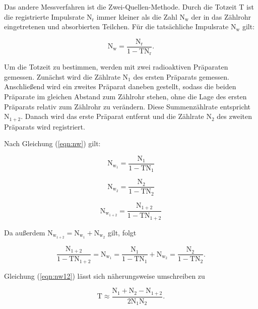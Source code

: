 \noindent
Das andere Messverfahren ist die Zwei-Quellen-Methode.
Durch die Totzeit T ist die registrierte Impulsrate $\text{N}_\text{r}$ immer kleiner als die Zahl $\text{N}_\text{w}$ der in das Zählrohr eingetretenen und absorbierten Teilchen.
Für die tatsächliche Impulsrate $\text{N}_\text{w}$ gilt:

\begin{equation}
\text{N}_\text{w}=\frac{\text{N}_\text{r}}{1-\text{T}\text{N}_\text{r}}.
\label{eqn:nw}
\end{equation}

\noindent
Um die Totzeit zu bestimmen, werden mit zwei radioaktiven Präparaten gemessen.
Zunächst wird die Zählrate $\text{N}_1$ des ersten Präparats gemessen.
Anschließend wird ein zweites Präparat daneben gestellt, sodass die beiden Präparate im gleichen Abstand zum Zählrohr stehen, 
ohne die Lage des ersten Präparats relativ zum Zählrohr zu verändern.
Diese Summenzählrate entspricht $\text{N}_{1+2}$.
Danach wird das erste Präparat entfernt und die Zählrate $\text{N}_2$ des zweiten Präparats wird registriert.

\noindent
Nach Gleichung (\ref{eqn:nw}) gilt:

\begin{equation*}
\text{N}_{\text{w}_1}=\frac{\text{N}_1}{1-\text{T}\text{N}_1}
\end{equation*}

\begin{equation*}
\text{N}_{\text{w}_2}=\frac{\text{N}_2}{1-\text{T}\text{N}_2}
\end{equation*}

\begin{equation*}
\text{N}_{\text{w}_{1+2}}=\frac{\text{N}_{1+2}}{1-\text{T}\text{N}_{1+2}}
\end{equation*}

\noindent
Da außerdem $\text{N}_{\text{w}_{1+2}}=\text{N}_{\text{w}_1}+\text{N}_{\text{w}_2}$ gilt, folgt

\begin{equation}
\frac{\text{N}_{1+2}}{1-\text{T}\text{N}_{1+2}}=\text{N}_{\text{w}_1}=\frac{\text{N}_1}{1-\text{T}\text{N}_1}+\text{N}_{\text{w}_2}=\frac{\text{N}_2}{1-\text{T}\text{N}_2}.
\label{eqn:nw12}
\end{equation}

\noindent
Gleichung (\ref{eqn:nw12}) lässt sich näherungsweise umschreiben zu

\begin{equation}
\text{T} \approx \frac{\text{N}_1 + \text{N}_2 - \text{N}_{1+2}}{2\text{N}_1\text{N}_2}.
\label{eqn:t}
\end{equation}

